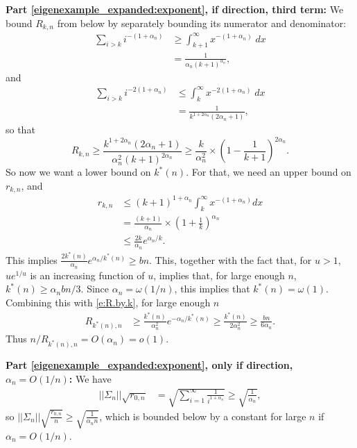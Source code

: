 \documentclass[11pt,notitlepage]{article}
\begin{document}
\noindent
{\bf Part \ref{eigenexample_expanded:exponent}, if direction, third term:}  
We bound $R_{k,n}$ from below by separately bounding
its numerator and denominator:
\begin{align*}
\sum_{i > k} i^{-(1 + \alpha_n)}
& \geq \int_{k+1}^{\infty} x^{-(1 + \alpha_n)} \;dx \\
& = \frac{1}{\alpha_n (k+1)^{\alpha_n}},
\end{align*}
and
\begin{align*}
\sum_{i > k} i^{-2 (1 + \alpha_n)} 
& \leq \int_k^{\infty} x^{-2 (1 + \alpha_n)} \;dx \\
& = \frac{1}{ k^{1 + 2 \alpha_n} (2 \alpha_n + 1)},
\end{align*}
so that
\begin{equation}
\label{e:R.by.k}
R_{k,n} 
 \geq \frac{k^{1 + 2 \alpha_n} (2 \alpha_n + 1)}{\alpha_n^2 (k+1)^{2 \alpha_n}}
 \geq 
 \frac{k}{\alpha_n^2}
  \times
 \left( 1 - \frac{1}{k+1} \right)^{2 \alpha_n}.
\end{equation}
So now we want a lower bound on $k^*(n)$.  For that, we need
an upper bound on $r_{k,n}$, and
\begin{align*}
r_{k,n}
& \leq (k+1)^{1 + \alpha_n} \int_k^{\infty} x^{-(1 + \alpha_n)} dx \\
& = 
 \frac{(k+1)}{\alpha_n}
  \times
 \left(1 + \frac{1}{k} \right)^{\alpha_n} \\
& \leq 
 \frac{2 k}{\alpha_n} e^{\alpha_n/k}.
\end{align*}
This implies $\frac{2 k^*(n)}{\alpha_n} e^{\alpha_n/k^*(n)} \geq b n$.  
This, together with the fact
that,
for $u > 1$, $u e^{1/u}$ is an increasing function
of $u$, implies that, for large enough $n$,
$k^*(n) \geq \alpha_n b n/3$.  
Since $\alpha_n = \omega(1/n)$, this implies
that $k^*(n) = \omega(1)$.  
Combining this with \eqref{e:R.by.k},
for large enough $n$
\begin{align*}
R_{k^*(n),n} 
 & \geq  \frac{k^*(n)}{\alpha_n^2} e^{-\alpha_n/k^*(n)} 
 \geq  \frac{k^*(n)}{2 \alpha_n^2} 
 \geq  \frac{b n}{6 \alpha_n}.
\end{align*}
Thus $n/R_{k^*(n),n} = O(\alpha_n) = o(1)$.

\noindent
{\bf Part \ref{eigenexample_expanded:exponent}, only if direction, $\alpha_n = O(1/n)$:}  
We have
\begin{align*}
|| \Sigma_n || \sqrt{r_{0,n}} 
 &= \sqrt{\sum_{i=1}^{\infty} \frac{1}{i^{1+\alpha_n}}} 
  \geq \sqrt{\frac{1}{\alpha_n}},
\end{align*}
so $|| \Sigma_n || \sqrt{\frac{r_{0,n}}{n}}
     \geq \sqrt{\frac{1}{\alpha_n n}}$, which is 
bounded below by a constant for large $n$ if 
$\alpha_n = O(1/n)$.
\end{document}
